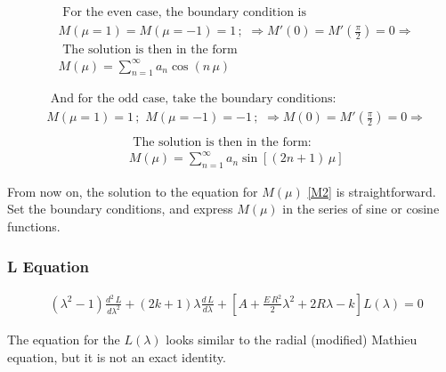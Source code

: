 \begin{equation}\label{Meven}
\begin{split}
& \text{ For the even case, the boundary condition is } \\[.8em]
& M(\mu = 1) = M(\mu = -1) = 1\,;\,\,\Rightarrow  M'(0) = M'\left(\frac{\pi}{2}\right) = 0 \Rightarrow \\[.8em] 
& \text{ The solution is then in the form } \\[.8em]
& M(\mu) = \sum_{n=1}^{\infty}{a_n \cos\left(n\,\mu\right)}
\end{split}
\end{equation}

\begin{equation}\label{Modd1}
\begin{split}
& \text{ And for the odd case, take the boundary conditions: } \\[.8em]
& M(\mu = 1) = 1\,;\,\,M(\mu = -1) = -1\,;\,\,\Rightarrow  M(0) = M'\left(\frac{\pi}{2}\right) = 0 \Rightarrow \\[.8em] 
\end{split}
\end{equation}
\begin{equation}\label{Modd2}
\begin{split}
& \text{ The solution is then in the form: } \\[.8em]
& M(\mu) = \sum_{n=1}^{\infty}{a_n \sin\left[\left(2n+1\right)\,\mu\right]} 
\end{split}
\end{equation}

From now on, the solution to the equation for $ M(\mu) $ \eqref{M2} is straightforward. Set the boundary conditions, and express  $ M(\mu) $ in the series of sine or cosine functions.

\subsubsection{ L Equation }

\begin{equation}\label{L2-2}
\begin{split}
& (\lambda^2-1)\frac{d^2\,L}{d\lambda^2} + (2k+1)\lambda \frac{d\,L}{d\lambda} +  \left[A + \frac{E\,R^2}{2}\lambda^2 + 2R\lambda  -k \right]L(\lambda) = 0
\end{split}
\end{equation}

The equation for the $ L(\lambda) $ looks similar to the radial (modified) Mathieu equation, but it is not an exact identity. 

